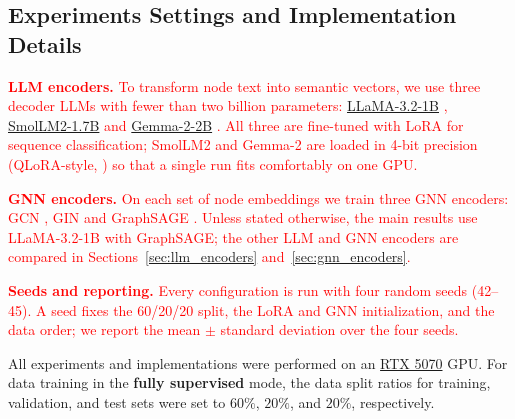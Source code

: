 \documentclass[a4paper,fleqn]{cas-sc}
\newcommand{\revone}[1]{\textcolor{red}{#1}}   %
\begin{document}

\subsection{Experiments Settings and Implementation Details}
\revone{\textbf{LLM encoders.} To transform node text into semantic vectors, we use three decoder LLMs with fewer than two billion parameters: \href{https://huggingface.co/meta-llama/Llama-3.2-1B}{LLaMA-3.2-1B} \citep{grattafiori2024llama3}, \href{https://huggingface.co/HuggingFaceTB/SmolLM2-1.7B}{SmolLM2-1.7B} \citep{allal2025smollm2} and \href{https://huggingface.co/google/gemma-2-2b}{Gemma-2-2B} \citep{gemmateam2024gemma2}. All three are fine-tuned with LoRA \citep{Hu2021LoRA} for sequence classification; SmolLM2 and Gemma-2 are loaded in 4-bit precision (QLoRA-style, \citealp{dettmers2023qlora}) so that a single run fits comfortably on one GPU.}

\revone{\textbf{GNN encoders.} On each set of node embeddings we train three GNN encoders: GCN \citep{Kipf2016GCN}, GIN \citep{xu2019gin} and GraphSAGE \citep{hamilton2017sage}. Unless stated otherwise, the main results use LLaMA-3.2-1B with GraphSAGE; the other LLM and GNN encoders are compared in Sections~\ref{sec:llm_encoders} and~\ref{sec:gnn_encoders}.}

\revone{\textbf{Seeds and reporting.} Every configuration is run with four random seeds (42--45). A seed fixes the 60/20/20 split, the LoRA and GNN initialization, and the data order; we report the mean $\pm$ standard deviation over the four seeds.}

All experiments and implementations were performed on an \href{https://www.nvidia.com/de-de/geforce/graphics-cards/50-series/rtx-5070-family/}{RTX 5070} GPU. For data training in the \textbf{fully supervised} mode, the data split ratios for training, validation, and test sets were set to $60\%$, $20\%$, and $20\%$, respectively.
\end{document}
